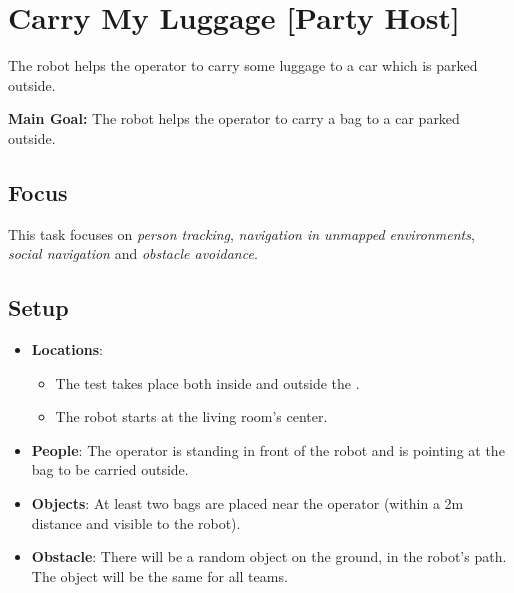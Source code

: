 \section{Carry My Luggage [Party Host]}
\label{test:carry-my-luggage}


The robot helps the operator to carry some luggage to a car which is parked outside.

\noindent \textbf{Main Goal:} The robot helps the operator to carry a bag to a car parked outside.\\


\subsection*{Focus}
This task focuses on \textit{person tracking}, \emph{navigation in unmapped environments}, \emph{social navigation} and \textit{obstacle avoidance}.

\subsection*{Setup}
\begin{itemize}[nosep]
	\item \textbf{Locations}: 
		\begin{itemize}
		 \item The test takes place both inside and outside the \Arena{}.
		 \item The robot starts at the living room's center.
		\end{itemize}
	\item \textbf{People}: The operator is standing in front of the robot and is pointing at the bag to be carried outside.
	\item \textbf{Objects}: At least two bags are placed near the operator (within a 2m distance and visible to the robot).
	\item \textbf{Obstacle}: There will be a random object on the ground, in the robot's path. The object will be the same for all teams.
\end{itemize}

